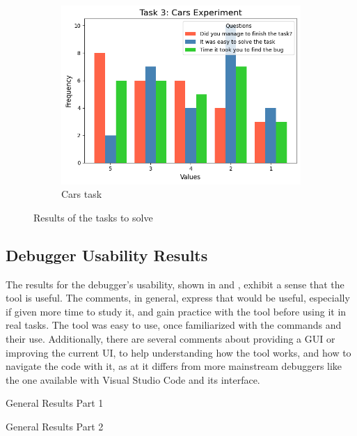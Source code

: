 \begin{figure}[hptb]
\begin{subfigure}[b]{0.32\textwidth}
        \includegraphics[width=\textwidth]{figures/task3}
        \caption{Cars task}
        \label{fig:task3}
    \end{subfigure}
    \caption{Results of the tasks to solve}
    \label{fig:general-know}
\end{figure}


\subsection{Debugger Usability Results}
\label{sec:usability}

The results for  the debugger's usability, shown in  and 
, exhibit a sense that the tool is useful. The comments, in general,  
express that \flik would be useful, especially if given more time to study it, and gain practice with the 
tool before using it in real tasks. The tool was easy to use, once familiarized with the commands and 
their use. Additionally, there are several comments about providing a GUI or improving the current UI,
to help understanding how the tool works, and how to navigate the code with it, as at it differs from 
more mainstream debuggers like the one available with Visual Studio Code and its interface.

\begin{table}[H]
  \centering
  \caption{General Results Part 1}
  
  \label{tab:general1-debuggers}
\end{table}

\begin{table}[H]
  \centering
  \caption{General Results Part 2}
  
  \label{tab:general2-debuggers}
\end{table}

